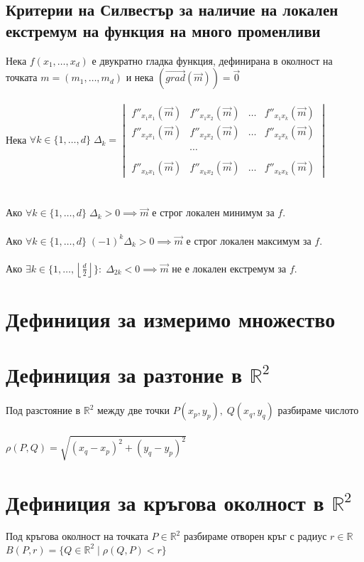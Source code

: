 \documentclass[14pt]{extarticle}
\newcommand{\R}{\mathbb{R}}
\newcommand{\Vector}[1]{\overrightarrow{#1}}
\begin{document}
\subsection*{Критерии на Силвестър за наличие на локален екстремум на функция на много променливи}
Нека \(f(x_1, \dots, x_d)\) е двукратно гладка функция, дефинирана в околност на точката \(m = (m_1, \dots, m_d)\) и нека \((\Vector{grad}(\Vector{m})) = \Vector{0}\) \\\\
Нека \(\forall k \in \{1, \dots, d\} \; \Delta_k = \begin{vmatrix}
f''_{x_1x_1}(\Vector{m}) & f''_{x_1x_2}(\Vector{m}) & \dots & f''_{x_1x_k}(\Vector{m}) \\
f''_{x_2x_1}(\Vector{m}) & f''_{x_2x_2}(\Vector{m}) & \dots & f''_{x_2x_k}(\Vector{m}) \\
~ \\
 ~ &  \cdots & ~ \\
~ \\
f''_{x_kx_1}(\Vector{m}) & f''_{x_kx_2}(\Vector{m}) & \dots & f''_{x_kx_k}(\Vector{m})
\end{vmatrix} \) \\\\\\
Ако \(\forall k \in \{1, \dots, d\} \; \Delta_k > 0 \implies \Vector{m}\) е строг локален минимум за \(f\). \\\\
Ако \(\forall k \in \{1, \dots, d\} \; (-1)^k\Delta_k > 0 \implies \Vector{m}\) е строг локален максимум за \(f\). \\\\
Ако \(\exists k \in \{1, \dots, \left\lfloor \frac{d}{2} \right\rfloor\} : \; \Delta_{2k} < 0 \implies \Vector{m}\) не е локален екстремум за \(f\).
\section*{Дефиниция за измеримо множество}
\section*{Дефиниция за разтоние в \(\R^2\)}
Под разстояние в \(\R^2\) между две точки \(P(x_p, y_p), \; Q(x_q, y_q)\) разбираме числото \\\\
\(\rho(P, Q) = \sqrt{(x_q - x_p)^2 + (y_q - y_p)^2}\)
\section*{Дефиниция за кръгова околност в \(\R^2\)}
Под кръгова околност на точката \(P \in \R^2\) разбираме отворен кръг с радиус \(r \in \R\) \(B(P, r) = \{Q \in \R^2 \; | \; \rho(Q, P) < r\}\)
\end{document}
